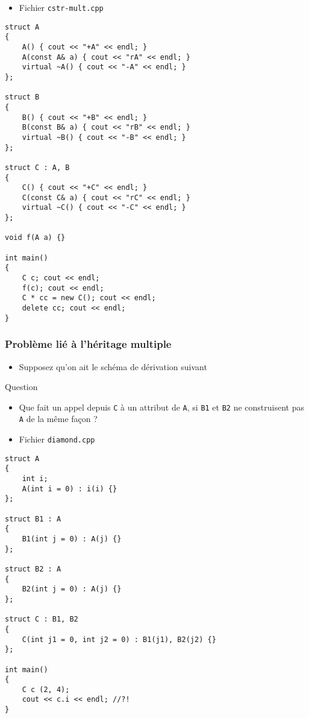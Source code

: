\begin{frame}[containsverbatim]
\begin{itemize}
\item Fichier \texttt{cstr-mult.cpp}
\end{itemize}
\begin{lstlisting}
struct A
{
	A() { cout << "+A" << endl; }
	A(const A& a) { cout << "rA" << endl; }
	virtual ~A() { cout << "-A" << endl; }
};

struct B
{
	B() { cout << "+B" << endl; }
	B(const B& a) { cout << "rB" << endl; }
	virtual ~B() { cout << "-B" << endl; }
};

struct C : A, B
{
	C() { cout << "+C" << endl; }
	C(const C& a) { cout << "rC" << endl; }
	virtual ~C() { cout << "-C" << endl; }
};

void f(A a) {}

int main()
{
	C c; cout << endl;
	f(c); cout << endl;
	C * cc = new C(); cout << endl;
	delete cc; cout << endl;
}
\end{lstlisting}
\end{frame}

\begin{frame}
\frametitle{Problème lié à l'héritage multiple}
\begin{itemize}
 \item Supposez qu'on ait le schéma de dérivation suivant
\end{itemize}
\begin{center}
\end{center}
\begin{exampleblock}{Question}
	\begin{itemize}
	 \item Que fait un appel depuis \texttt{C} à un attribut de \texttt{A}, si \texttt{B1} et \texttt{B2} ne construisent pas \texttt{A} de la même façon ?
	\end{itemize}
\end{exampleblock}
\end{frame}

\begin{frame}[containsverbatim]
\begin{itemize}
\item Fichier \texttt{diamond.cpp}
\end{itemize}
\begin{lstlisting}
struct A
{
	int i;
	A(int i = 0) : i(i) {}
};

struct B1 : A
{
	B1(int j = 0) : A(j) {}
};

struct B2 : A
{
	B2(int j = 0) : A(j) {}
};

struct C : B1, B2
{
	C(int j1 = 0, int j2 = 0) : B1(j1), B2(j2) {}
};

int main()
{
	C c (2, 4);
	cout << c.i << endl; //?!
}
\end{lstlisting}
\end{frame}

